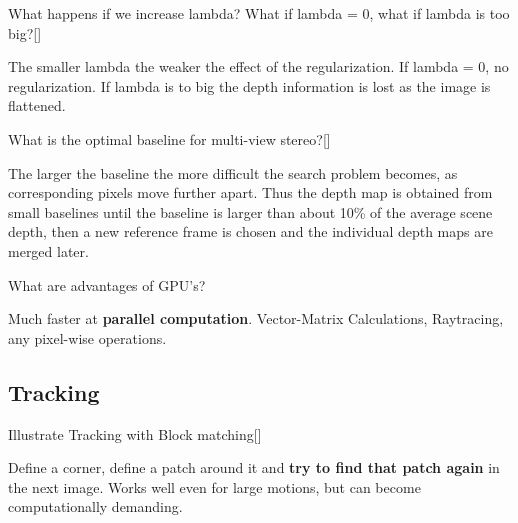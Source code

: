 \documentclass[10pt,a4paper]{scrartcl}
\begin{document}
\begin{multicols*}{2}
\begin{QandA}{What happens if we increase lambda? What if lambda = 0, what if lambda is too big?}[\Application]
\item The smaller lambda the weaker the effect of the regularization. If lambda = 0, no regularization. If lambda is to big the depth information is lost as the image is flattened.
\end{QandA}

\begin{QandA}
{What is the optimal baseline for multi-view stereo?}[\Application]
\item The larger the baseline the more difficult the search problem becomes, as corresponding pixels move further apart. Thus the depth map is obtained from small baselines until the baseline is larger than about 10\% of the average scene depth, then a new reference frame is chosen and the individual depth maps are merged later.
\end{QandA}

\begin{QandA}
{What are advantages of GPU's?}
\item Much faster at \textbf{parallel computation}. Vector-Matrix Calculations, Raytracing, any pixel-wise operations.
\end{QandA}

\subsection*{Tracking}

\begin{QandA}{Illustrate Tracking with Block matching}[\Definition]
\item Define a corner, define a patch around it and \textbf{try to find that patch again} in the next image. Works well even for large motions, but can become computationally demanding. 
\end{QandA}


\end{multicols*}
\end{document}
